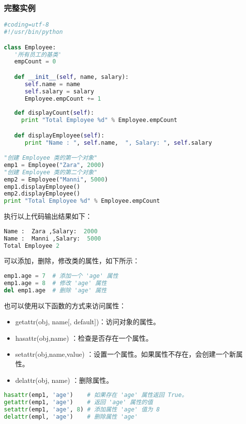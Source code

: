 \subsubsection{完整实例}
\begin{lstlisting}[language=Python]
#coding=utf-8
#!/usr/bin/python

class Employee:
   '所有员工的基类'
   empCount = 0

   def __init__(self, name, salary):
      self.name = name
      self.salary = salary
      Employee.empCount += 1
   
   def displayCount(self):
     print "Total Employee %d" % Employee.empCount

   def displayEmployee(self):
      print "Name : ", self.name,  ", Salary: ", self.salary

"创建 Employee 类的第一个对象"
emp1 = Employee("Zara", 2000)
"创建 Employee 类的第二个对象"
emp2 = Employee("Manni", 5000)
emp1.displayEmployee()
emp2.displayEmployee()
print "Total Employee %d" % Employee.empCount
\end{lstlisting}

执行以上代码输出结果如下：
\begin{lstlisting}[language=Python]
Name :  Zara ,Salary:  2000
Name :  Manni ,Salary:  5000
Total Employee 2
\end{lstlisting}

可以添加，删除，修改类的属性，如下所示：
\begin{lstlisting}[language=Python]
emp1.age = 7  # 添加一个 'age' 属性
emp1.age = 8  # 修改 'age' 属性
del emp1.age  # 删除 'age' 属性
\end{lstlisting}

也可以使用以下函数的方式来访问属性：
\begin{itemize}
\item getattr(obj, name[, default])：访问对象的属性。
\item hasattr(obj,name) ：检查是否存在一个属性。
\item setattr(obj,name,value) ：设置一个属性。如果属性不存在，会创建一个新属性。
\item delattr(obj, name) ：删除属性。
\end{itemize}

\begin{lstlisting}[language=Python]
hasattr(emp1, 'age')    # 如果存在 'age' 属性返回 True。
getattr(emp1, 'age')    # 返回 'age' 属性的值
setattr(emp1, 'age', 8) # 添加属性 'age' 值为 8
delattr(empl, 'age')    # 删除属性 'age'
\end{lstlisting}



